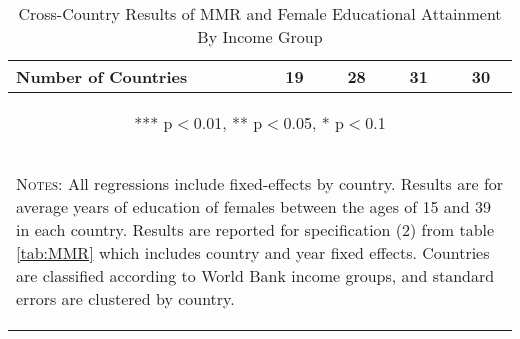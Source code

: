 \begin{subtables}
\begin{table}[htpb!]
\begin{center}
\begin{tabular}{lcccc}
Number of Countries	&	19	&	28	&	31	&	30	\\ \midrule
\multicolumn{5}{c}{\begin{footnotesize} *** p$<$0.01, ** p$<$0.05, * p$<$0.1\end{footnotesize}} \\									
\multicolumn{5}{p{12.5cm}}{\begin{footnotesize} \textsc{Notes:} All regressions include fixed-effects by country.  Results are for average years of education of females between the ages of 15 and 39 in each country.  Results are reported for specification (2) from table \ref{tab:MMR} which includes country and year fixed effects.  Countries are classified according to World Bank income groups, and standard errors are clustered by country. \end{footnotesize}} \\									
\bottomrule									
\end{tabular}									
\caption{Cross-Country Results of MMR and Female Educational Attainment By Income Group}									
\vspace{-6mm}									
\label{tab:MMRincome}									
\end{center}									
\end{table}									
\end{subtables}

